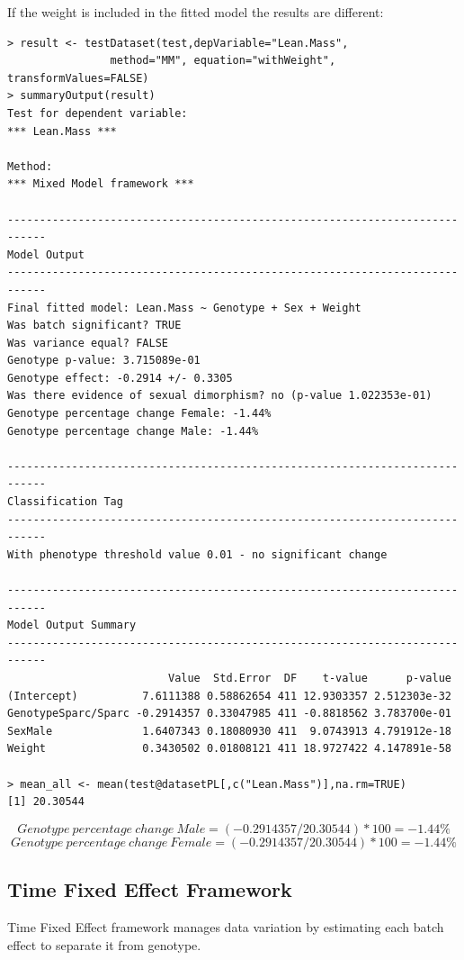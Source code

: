 \documentclass[12pt,a4paper]{article}
\begin{document}
If the weight is included in the fitted model the results are different:
\begingroup
\fontsize{8pt}{12pt}\selectfont
\begin{verbatim}
> result <- testDataset(test,depVariable="Lean.Mass", 
				method="MM", equation="withWeight", transformValues=FALSE)
> summaryOutput(result)
Test for dependent variable:
*** Lean.Mass ***

Method:
*** Mixed Model framework ***

----------------------------------------------------------------------------
Model Output
----------------------------------------------------------------------------
Final fitted model: Lean.Mass ~ Genotype + Sex + Weight
Was batch significant? TRUE
Was variance equal? FALSE
Genotype p-value: 3.715089e-01
Genotype effect: -0.2914 +/- 0.3305
Was there evidence of sexual dimorphism? no (p-value 1.022353e-01)
Genotype percentage change Female: -1.44%
Genotype percentage change Male: -1.44%

----------------------------------------------------------------------------
Classification Tag
----------------------------------------------------------------------------
With phenotype threshold value 0.01 - no significant change

----------------------------------------------------------------------------
Model Output Summary
----------------------------------------------------------------------------
                         Value  Std.Error  DF    t-value      p-value
(Intercept)          7.6111388 0.58862654 411 12.9303357 2.512303e-32
GenotypeSparc/Sparc -0.2914357 0.33047985 411 -0.8818562 3.783700e-01
SexMale              1.6407343 0.18080930 411  9.0743913 4.791912e-18
Weight               0.3430502 0.01808121 411 18.9727422 4.147891e-58

> mean_all <- mean(test@datasetPL[,c("Lean.Mass")],na.rm=TRUE)  
[1] 20.30544
\end{verbatim}
\endgroup 
\[
Genotype\:percentage\:change\:Male = (-0.2914357/20.30544)*100 = -1.44\%
\]
\[
Genotype\:percentage\:change\:Female = (-0.2914357/20.30544)*100 = -1.44\%
\]

\subsection{Time Fixed Effect Framework}
Time Fixed Effect framework manages data variation by estimating each batch effect to separate it from genotype.
\end{document}
